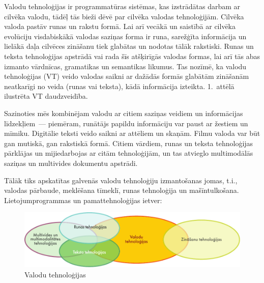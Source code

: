 \clearpage



\begin{multicols}{2}

Valodu tehnoloģijas ir programmatūras sistēmas, kas izstrādātas darbam ar cilvēka valodu, tādēļ tās bieži dēvē par cilvēka valodas tehnoloģijām.
Cilvēka valoda pastāv runas un rakstu formā.
Lai arī vecākā un saistībā ar cilvēka evolūciju visdabiskākā valodas saziņas forma ir runa, sarežģīta informācija un lielākā daļa cilvēces zināšanu tiek glabātas un nodotas tālāk rakstiski.
Runas un teksta tehnoloģijas apstrādā vai rada šīs atšķirīgās valodas formas, lai arī tās abas izmanto vārdnīcas,  gramatikas un semantikas likumus.
Tas nozīmē, ka valodu tehnoloģijas (VT) veido valodas saikni ar dažādās formās glabātām zināšanām neatkarīgi no veida (runas vai teksta), kādā informācija izteikta.
1.~attēlā ilustrēta VT daudzveidība.

Sazinoties mēs kombinējam valodu ar citiem saziņas veidiem un informācijas līdzekļiem~--- piemēram, runātājs papildu informāciju var paust ar žestiem un mīmiku.
Digitālie teksti veido saikni ar attēliem un skaņām.
Filmu valoda var būt gan mutiskā, gan rakstiskā formā.
Citiem vārdiem, runas un teksta tehnoloģijas pārklājas un mijiedarbojas ar citām tehnoloģijām, un tas atvieglo multimodālās saziņas un multivides dokumentu apstrādi. 

Tālāk tiks apskatītas galvenās valodu tehnoloģiju izmantošanas jomas, t.i., valodas pārbaude, meklēšana tīmeklī, runas tehnoloģija un mašīntulkošana.
Lietojumprogrammas un pamattehnoloģijas ietver: 

\begin{figure}[htb]
  \center
  \includegraphics[width=\textwidth]{../_media/latvian/language_technologies}
  \caption{Valodu tehnoloģijas}
  \label{fig:ltincontext_de}
\end{figure}


\end{multicols}
